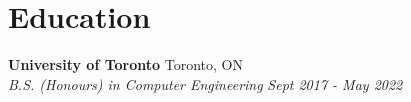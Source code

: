 \section{Education}
\resumeSubHeadingListStart
    \item
        \textbf{University of Toronto} \hfill \textcolor{primaryColor}{Toronto, ON} \\
        \textcolor{tertiaryColor}{\textit{B.S. (Honours) in Computer Engineering}} \hfill \textcolor{secondaryColor}{\textit{Sept 2017 - May 2022}}
    \resumeItemListStart
    \resumeItemListEnd
\resumeSubHeadingListEnd 